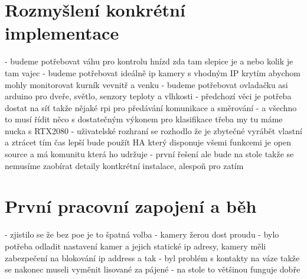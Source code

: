 \section{Rozmyšlení konkrétní implementace}\label{sec:rozmysleni-konkretni-implementace}
- budeme potřebovat váhu pro kontrolu hnízd zda tam slepice je a nebo kolik je tam vajec\newline
- budeme potřebovat ideálně ip kamery s vhodným IP krytím abychom mohly monitorovat kurník vevnitř a venku\newline
- budeme potřebovat ovladačku asi arduino pro dveře, světlo, senzory teploty a vlhkosti\newline
- předchozí věci je potřeba dostat na síť takže nějaké rpi pro předávání komunikace a směrování\newline
- a všechno to musí řídit něco s dostatečným výkonem pro klasifikace třeba my tu máme nucka s RTX2080\newline
- uživatelské rozhraní se rozhodlo že je zbytečné vyrábět vlastní a ztrácet tím čas lepší bude použít HA který disponuje všemi funkcemi je open source a má komunitu která ho udržuje
- první řešení ale bude na stole takže se nemusíme zaobírat detaily kontkrétní instalace, alespoň pro zatím


\section{První pracovní zapojení a běh}\label{sec:prvni-pracovni-zapojeni-a-beh}
- zjistilo se že bez poe je to špatná volba \newline
- kamery žerou dost proudu\newline
- bylo potřeba odladit nastavení kamer a jejich statické ip adresy, kamery měli zabezpečení na blokování ip address a tak\newline
- byl problém s kontakty na váze takže se nakonec museli vyměnit lisované za pájené\newline
- na stole to většinou funguje dobře \newline


